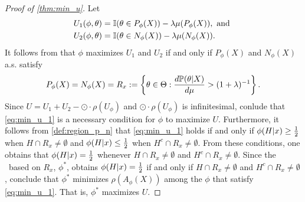 \begin{proof}[Proof of \cref{thm:min_u}]
 Let 
 \begin{align*}
  U_1(\phi, \theta) &= \I(\theta \in P_{\phi}(X)) - \lambda \mu(P_{\phi}(X)), \text{ and } \\
  U_2(\phi, \theta) &= \I(\theta \in N_{\phi}(X)) - \lambda \mu(N_{\phi}(X)).
 \end{align*}
 It follows from \citet{Schervish2012} that
 $\phi$ maximizes $U_1$ and $U_2$ 
 if and only if $P_{\phi}(X)$ and $N_{\phi}(X)$
 a.s. satisfy
 \begin{align}
  \label{eq:min_u_1}
  P_{\phi}(X) = N_{\phi}(X) =
  R_x :=
  \left\{\theta \in \Theta: 
  \frac{d\P(\theta|X)}{d\mu} > (1+\lambda)^{-1} \right\}.
 \end{align}
 Since $U = U_1 + U_2 -\odot \cdot \rho(U_{\phi})$
 and $\odot \cdot \rho(U_{\phi})$ is infinitesimal,
 conlude that \cref{eq:min_u_1} is 
 a necessary condition for
 $\phi$ to maximize $U$.
 Furthermore, it follows from \cref{def:region_p_n} that \cref{eq:min_u_1} holds 
 if and only if
 $\phi(H|x) \geq \half$ when
 $H \cap R_x \neq \emptyset$ and
 $\phi(H|x) \leq \half$ when
 $H^c \cap R_x \neq \emptyset$.
 From these conditions, one obtains that
 $\phi(H|x) = \half$ whenever
 $H \cap R_x \neq \emptyset$ and
 $H^c \cap R_x \neq \emptyset$.
 Since the \summ\ based on $R_x$, $\phi^*$,
 obtains $\phi(H|x) = \half$ if and only if
 $H \cap R_x \neq \emptyset$ and
 $H^c \cap R_x \neq \emptyset$, conclude that
 $\phi^*$ minimizes $\rho(A_{\phi}(X))$ among
 the $\phi$ that satisfy \cref{eq:min_u_1}.
 That is, $\phi^*$ maximizes $U$.
\end{proof}